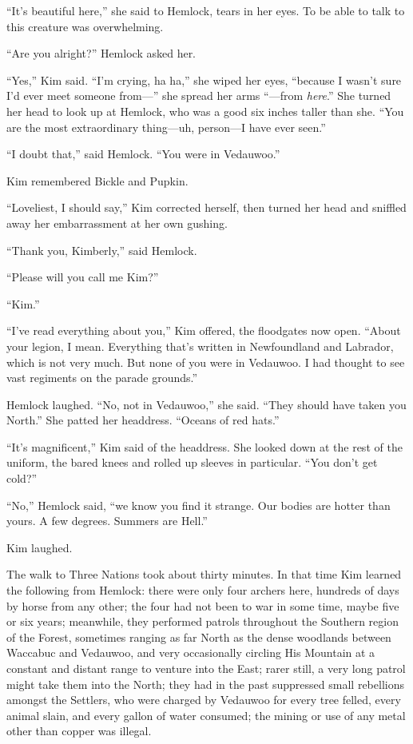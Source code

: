\documentclass[11pt,a5paper]{article}
\begin{document}
``It's beautiful here,'' she said to Hemlock, tears in her eyes. To be able to talk to this creature was overwhelming.

``Are you alright?'' Hemlock asked her.

``Yes,'' Kim said. ``I'm crying, ha ha,'' she wiped her eyes, ``because I wasn't sure I'd ever meet someone from---'' she spread her arms ``---from \emph{here}.'' She turned her head to look up at Hemlock, who was a good six inches taller than she. ``You are the most extraordinary thing---uh, person---I have ever seen.''

``I doubt that,'' said Hemlock. ``You were in Vedauwoo.''

Kim remembered Bickle and Pupkin.

``Loveliest, I should say,'' Kim corrected herself, then turned her head and sniffled away her embarrassment at her own gushing.

``Thank you, Kimberly,'' said Hemlock.

``Please will you call me Kim?''

``Kim.''

``I've read everything about you,'' Kim offered, the floodgates now open. ``About your legion, I mean. Everything that's written in Newfoundland and Labrador, which is not very much. But none of you were in Vedauwoo. I had thought to see vast regiments on the parade grounds.''

Hemlock laughed. ``No, not in Vedauwoo,'' she said. ``They should have taken you North.'' She patted her headdress. ``Oceans of red hats.''

``It's magnificent,'' Kim said of the headdress. She looked down at the rest of the uniform, the bared knees and rolled up sleeves in particular. ``You don't get cold?''

``No,'' Hemlock said, ``we know you find it strange. Our bodies are hotter than yours. A few degrees. Summers are Hell.''

Kim laughed.

The walk to Three Nations took about thirty minutes. In that time Kim learned the following from Hemlock: there were only four archers here, hundreds of days by horse from any other; the four had not been to war in some time, maybe five or six years; meanwhile, they performed patrols throughout the Southern region of the Forest, sometimes ranging as far North as the dense woodlands between Waccabuc and Vedauwoo, and very occasionally circling His Mountain at a constant and distant range to venture into the East; rarer still, a very long patrol might take them into the North; they had in the past suppressed small rebellions amongst the Settlers, who were charged by Vedauwoo for every tree felled, every animal slain, and every gallon of water consumed; the mining or use of any metal other than copper was illegal.
\end{document}
